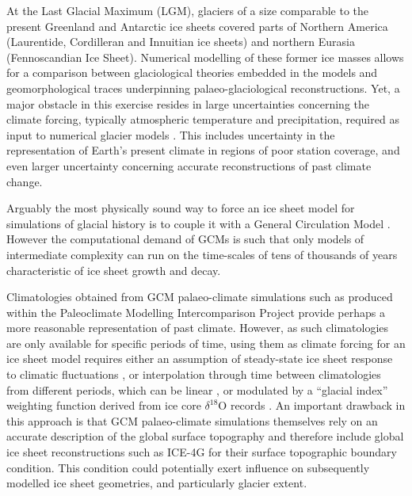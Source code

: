 \introduction
\label{sec:intro}

At the Last Glacial Maximum (LGM), glaciers of a size comparable to the present Greenland and Antarctic ice sheets covered parts of Northern America (Laurentide, Cordilleran and Innuitian ice sheets) and northern Eurasia (Fennoscandian Ice Sheet). Numerical modelling of these former ice masses allows for a comparison between glaciological theories embedded in the models and geomorphological traces underpinning palaeo-glaciological reconstructions. Yet, a major obstacle in this exercise resides in large uncertainties concerning the climate forcing, typically atmospheric temperature and precipitation, required as input to numerical glacier models \citep{hebeler-etal-2008}. This includes uncertainty in the representation of Earth's present climate in regions of poor station coverage, and even larger uncertainty concerning accurate reconstructions of past climate change.

Arguably the most physically sound way to force an ice sheet model for simulations of glacial history is to couple it with a General Circulation Model \citep[GCM;][]{yoshimori-etal-2001,calov-etal-2002,abeouchi-etal-2007,charbit-etal-2013}. However the computational demand of GCMs is such that only models of intermediate complexity can run on the time-scales of tens of thousands of years characteristic of ice sheet growth and decay.

Climatologies obtained from GCM palaeo-climate simulations such as produced within the Paleoclimate Modelling Intercomparison Project \citep[PMIP;][]{joussaume-taylor-1995} provide perhaps a more reasonable representation of past climate. However, as such climatologies are only available for specific periods of time, using them as climate forcing for an ice sheet model requires either an assumption of steady-state ice sheet response to climatic fluctuations \citep{huybrechts-tsiobbel-1996}, or interpolation through time between climatologies from different periods, which can be linear \citep{charbit-etal-2002}, or modulated by a ``glacial index'' weighting function derived from ice core $\delta^{18}$O records \citep{marshall-clarke-1999,tarasov-peltier-2004,zweck-huybrechts-2005,gregoire-etal-2012}. An important drawback in this approach is that GCM palaeo-climate simulations themselves rely on an accurate description of the global surface topography and therefore include global ice sheet reconstructions such as ICE-4G \citep{peltier-1994} for their surface topographic boundary condition. This condition could potentially exert influence on subsequently modelled ice sheet geometries, and particularly glacier extent.

